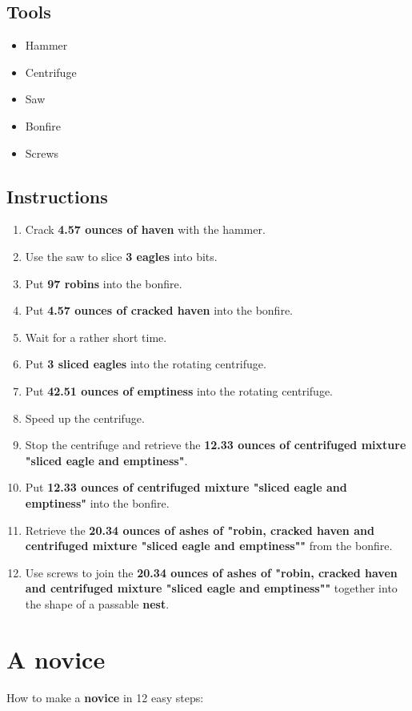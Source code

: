 \documentclass{article}
\begin{document}
\subsection{Tools}\begin{itemize}
\item 
Hammer
\item 
Centrifuge
\item 
Saw
\item 
Bonfire
\item 
Screws
\end{itemize}
\subsection{Instructions}\begin{enumerate}
\item 
Crack \textbf{4.57 ounces of haven} with the hammer.
\item 
Use the saw to slice \textbf{3 eagles} into bits.
\item 
Put \textbf{97 robins} into the bonfire.
\item 
Put \textbf{4.57 ounces of cracked haven} into the bonfire.
\item 
Wait for a rather short time.
\item 
Put \textbf{3 sliced eagles} into the rotating centrifuge.
\item 
Put \textbf{42.51 ounces of emptiness} into the rotating centrifuge.
\item 
Speed up the centrifuge.
\item 
Stop the centrifuge and retrieve the \textbf{12.33 ounces of centrifuged mixture "sliced eagle and emptiness"}.
\item 
Put \textbf{12.33 ounces of centrifuged mixture "sliced eagle and emptiness"} into the bonfire.
\item 
Retrieve the \textbf{20.34 ounces of ashes of "robin, cracked haven and centrifuged mixture "sliced eagle and emptiness""} from the bonfire.
\item 
Use screws to join the \textbf{20.34 ounces of ashes of "robin, cracked haven and centrifuged mixture "sliced eagle and emptiness""} together into the shape of a passable \textbf{nest}.
\end{enumerate}
\newpage
\section{A novice}How to make a \textbf{novice} in 12 easy steps:
\end{document}
